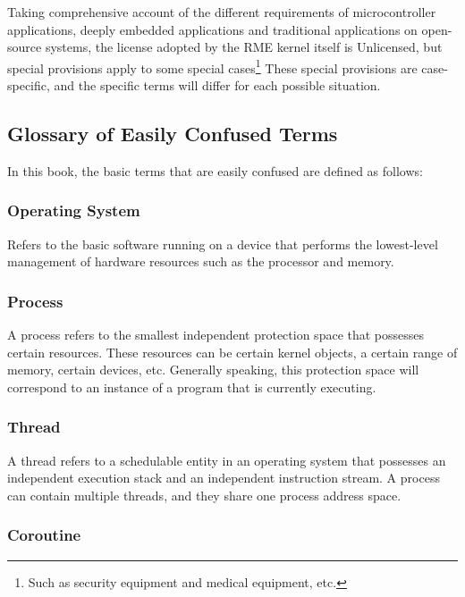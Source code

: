 Taking comprehensive account of the different requirements of microcontroller applications, deeply embedded applications and traditional applications on open-source systems, the license adopted by the RME kernel itself is Unlicensed, but special provisions apply to some special cases\footnote{Such as security equipment and medical equipment, etc.} These special provisions are case-specific, and the specific terms will differ for each possible situation.

\subsection{Glossary of Easily Confused Terms}\label{subsec:1-terms-and-definitions}

In this book, the basic terms that are easily confused are defined as follows:

\subsubsection{Operating System}\label{subsubsec:1-operating-system}

Refers to the basic software running on a device that performs the lowest-level management of hardware resources such as the processor and memory.

\subsubsection{Process}\label{subsubsec:1-process}

A process refers to the smallest independent protection space that possesses certain resources. These resources can be certain kernel objects, a certain range of memory, certain devices, etc. Generally speaking, this protection space will correspond to an instance of a program that is currently executing.

\subsubsection{Thread}\label{subsubsec:1-thread}

A thread refers to a schedulable entity in an operating system that possesses an independent execution stack and an independent instruction stream. A process can contain multiple threads, and they share one process address space.

\subsubsection{Coroutine}\label{subsubsec:1-coroutine}

